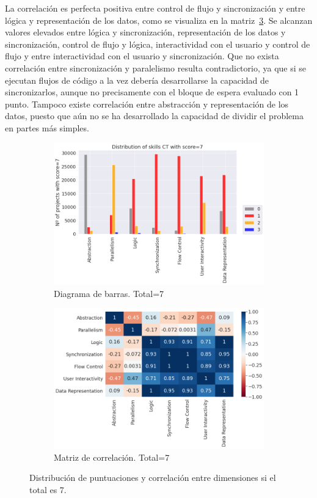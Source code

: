 \documentclass[a4paper, 12pt]{book}
\begin{document}
La correlación es perfecta positiva entre control de flujo y sincronización y entre lógica y representación de los datos, como se visualiza en la matriz~\ref{fig:corr7}. Se alcanzan valores elevados entre lógica y sincronización, representación de los datos y sincronización, control de flujo y lógica, interactividad con el usuario y control de flujo y entre interactividad con el usuario y sincronización. Que no exista correlación entre sincronización y paralelismo resulta contradictorio, ya que si se ejecutan flujos de código a la vez debería desarrollarse la capacidad de sincronizarlos, aunque no precisamente con el bloque de espera evaluado con 1 punto. Tampoco existe correlación entre abstracción y representación de los datos, puesto que aún no se ha desarrollado la capacidad de dividir el problema en partes más simples.

\begin{figure}[H]
    \centering
    \begin{subfigure}[h]{.49\textwidth} 
        \includegraphics[width=\textwidth]{img/distribucion_7_Scratch}
        \caption{Diagrama de barras. Total=7}
        \label{fig:total7}
    \end{subfigure}       
    \begin{subfigure}[h]{.49\textwidth} 
        \includegraphics[width=\textwidth]{img/corr_7_Scratch}
        \caption{Matriz de correlación. Total=7}
        \label{fig:corr7}
    \end{subfigure}
     \caption{Distribución de puntuaciones y correlación entre dimensiones si el total es 7.}
\end{figure}
\end{document}
